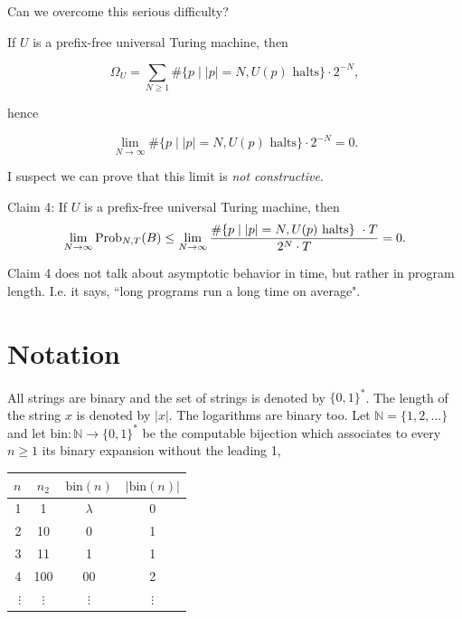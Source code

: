 \documentclass[12pt,twoside,openright]{report}
\newcommand{\NN}{\mathbb{N}}
\newcommand{\ctr}[1]{\begin{center} #1 \end{center}}
\newcommand{\bin}{\mbox{bin}}
\newcommand{\Prob}{{\rm Prob}}
\begin{document}
Can we overcome this serious difficulty?

\medskip

If $U$ is a prefix-free universal Turing machine, then

\[\Omega_{U} = \sum_{N\ge 1} \#\{ p \mid |p|=N, U(p) \mbox{  halts}\}\cdot 2^{-N},\]

\noindent hence

\[\lim_{N \rightarrow \infty}   \#\{ p \mid |p|=N, U(p) \mbox{  halts}\}\cdot 2^{-N}=0.\]

I suspect we can prove that this limit is {\it not constructive}.

\medskip

Claim 4:   If $U$ is a prefix-free universal Turing machine, then $$\lim_{N \rightarrow \infty}\Prob_{N,T}(B) \le \lim_{N \rightarrow \infty}
\frac{ \#\{ p \mid |p|=N, U(p) \mbox{  halts}\}\ \cdot T}{2^{N} \cdot T} =0.$$


Claim 4 does not talk about asymptotic behavior in time, but rather in program length.  I.e. it says,  ``long programs run a long time on average".
\fi
 
 
 
 


\section{Notation}

All strings are binary and the set of strings is denoted by $\{0, 1\}^{*}$.  The length of the string $x$ is denoted by $|x|$. The logarithms are binary too.  Let $\NN = \{1,2,\ldots\}$ and let $\bin:\NN \rightarrow \{0, 1\}^*$ be the computable bijection which associates to every $n\ge 1$ its binary expansion without the leading 1,  
\ctr{\begin{tabular}{r|c|c|c}
$n$&$n_2$&$\bin(n)$& $|\bin(n)|$\\
\hline
1&1&$\lambda$ & 0\\
2&10&0 & 1\\
3&11&1& 1\\
4&100&00 & 2\\
$\vdots$&$\vdots$&$\vdots$&$\vdots$
\end{tabular}}
\end{document}
